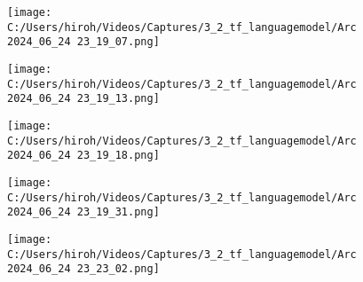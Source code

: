 \documentclass{ltjsarticle}
\begin{document}
\begin{figure}[htbp]
  \centering
  \texttt{[image: C:/Users/hiroh/Videos/Captures/3\_2\_tf\_languagemodel/Arc 2024\_06\_24 23\_19\_07.png]}
\end{figure}
\begin{figure}[htbp]
  \centering
  \texttt{[image: C:/Users/hiroh/Videos/Captures/3\_2\_tf\_languagemodel/Arc 2024\_06\_24 23\_19\_13.png]}
\end{figure}
\begin{figure}[htbp]
  \centering
  \texttt{[image: C:/Users/hiroh/Videos/Captures/3\_2\_tf\_languagemodel/Arc 2024\_06\_24 23\_19\_18.png]}
\end{figure}
\begin{figure}[htbp]
  \centering
  \texttt{[image: C:/Users/hiroh/Videos/Captures/3\_2\_tf\_languagemodel/Arc 2024\_06\_24 23\_19\_31.png]}
\end{figure}
\begin{figure}[htbp]
  \centering
  \texttt{[image: C:/Users/hiroh/Videos/Captures/3\_2\_tf\_languagemodel/Arc 2024\_06\_24 23\_23\_02.png]}
\end{figure}

\clearpage
\end{document}
